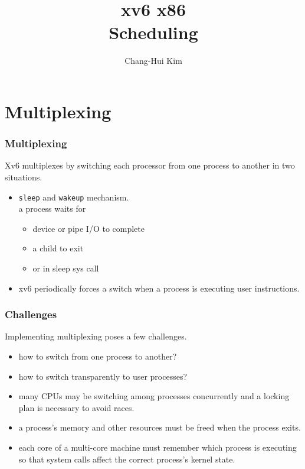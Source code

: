 \documentclass{beamer}
\title{xv6 x86 \\ Scheduling}
\author{Chang-Hui Kim}
\begin{document}
\begin{frame}
  \titlepage
\end{frame}


\section{Multiplexing}


\begin{frame}[t]
  \frametitle{Multiplexing}
  Xv6 multiplexes by switching each processor from one process to another in two situations.

  \begin{itemize}
  \item \texttt{sleep} and \texttt{wakeup} mechanism.\\
    a process waits for
    \begin{itemize}
    \item device or pipe I/O to complete
    \item a child to exit
    \item or in sleep sys call
    \end{itemize}
  \item xv6 periodically forces a switch when a process is executing user instructions.
  \end{itemize}
  
\end{frame}


\begin{frame}[t]
  \frametitle{Challenges}
  Implementing multiplexing poses a few challenges.

  \begin{itemize}
  \item how to switch from one process to another?
  \item how to switch transparently to user processes?
  \item many CPUs may be switching among processes concurrently and a locking plan
    is necessary to avoid races.
  \item a process's memory and other resources must be freed when the process exits.
  \item each core of a multi-core machine must remember which process is
    executing so that system calls affect the correct process's kernel state.
  \end{itemize}
  
\end{frame}
\end{document}
